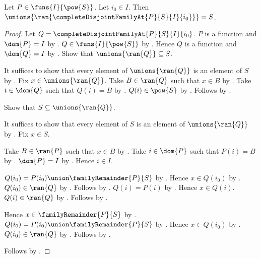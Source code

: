 \begin{proposition}\label{complete_disjoint_family_at_cover}
    Let $P\in\funs{I}{\pow{S}}$.
    Let $i_0\in I$.
    Then $\unions{\ran{\completeDisjointFamilyAt{P}{S}{I}{i_0}}}=S$.
\end{proposition}
\begin{proof}
    Let $Q=\completeDisjointFamilyAt{P}{S}{I}{i_0}$.
    $P$ is a function and $\dom{P}=I$
        by .
    $Q\in\funs{I}{\pow{S}}$ by
        .
    Hence $Q$ is a function and $\dom{Q}=I$
        by .
    Show that $\unions{\ran{Q}}\subseteq S$.
    \begin{subproof}
        It suffices to show that every element of $\unions{\ran{Q}}$
            is an element of $S$ by .
        Fix $x\in\unions{\ran{Q}}$.
        Take $B\in\ran{Q}$ such that $x\in B$ by .
        Take $i\in\dom{Q}$ such that $Q(i)=B$ by .
        $Q(i)\in\pow{S}$ by .
        Follows by .
    \end{subproof}
    Show that $S\subseteq\unions{\ran{Q}}$.
    \begin{subproof}
        It suffices to show that every element of $S$
            is an element of $\unions{\ran{Q}}$ by .
        Fix $x\in S$.
        \begin{byCase}
            Take $B\in\ran{P}$ such that $x\in B$ by .
            Take $i\in\dom{P}$ such that $P(i)=B$
                by .
            $\dom{P}=I$ by .
            Hence $i\in I$.
            \begin{byCase}
                $Q(i_0)=P(i_0)\union\familyRemainder{P}{S}$
                    by .
                Hence $x\in Q(i_0)$ by .
                $Q(i_0)\in\ran{Q}$
                    by .
                Follows by .
                $Q(i)=P(i)$
                    by .
                Hence $x\in Q(i)$.
                $Q(i)\in\ran{Q}$ by .
                Follows by .
            \end{byCase}
            Hence $x\in\familyRemainder{P}{S}$
                by .
            $Q(i_0)=P(i_0)\union\familyRemainder{P}{S}$
                by .
            Hence $x\in Q(i_0)$ by .
            $Q(i_0)\in\ran{Q}$ by .
            Follows by .
        \end{byCase}
    \end{subproof}
    Follows by .
\end{proof}

